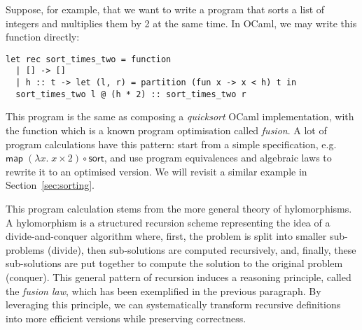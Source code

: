 \documentclass[a4paper,UKenglish,cleveref, autoref, thm-restate]{lipics-v2021}
\begin{document}
Suppose, for example, that we want to write a program that sorts a list of
integers and multiplies them by 2 at the same time. In OCaml, we may write this
function directly:

\pagebreak
\begin{verbatim}
let rec sort_times_two = function
  | [] -> []
  | h :: t -> let (l, r) = partition (fun x -> x < h) t in
  sort_times_two l @ (h * 2) :: sort_times_two r
\end{verbatim}

This program is the same as composing a \emph{quicksort} OCaml implementation,
with the function  which is a known program
optimisation called \emph{fusion}.  A lot of program calculations have this
pattern: start from a simple specification, e.g.
\\$\mathsf{map}\;(\lambda x.\;x \times 2) \circ \mathsf{sort}$, and use program
equivalences and algebraic laws to rewrite it to an optimised version. We will
revisit a similar example in Section~\ref{sec:sorting}.

This program calculation stems from the more general theory of hylomorphisms. A
hylomorphism is a structured recursion scheme representing the idea of a
divide-and-conquer algorithm where, first, the problem is split into smaller
sub-problems (divide), then sub-solutions are computed recursively, and,
finally, these sub-solutions are put together to compute the solution to the
original problem (conquer). This general pattern of recursion induces a
reasoning principle, called the \emph{fusion law}, which has been exemplified in
the previous paragraph. By leveraging this principle, we can systematically
transform recursive definitions into more efficient versions while preserving
correctness.
\end{document}

